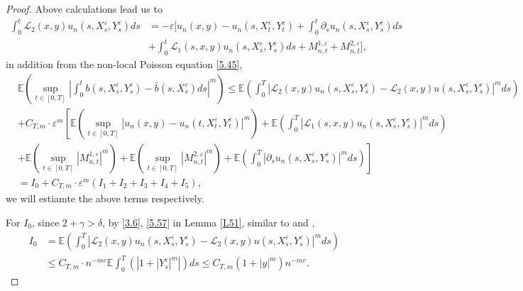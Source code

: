 \documentclass[11pt,reqno]{amsart}
\numberwithin{equation}{section}
\begin{document}
\begin{proof}
Above calculations lead us to 
\begin{align*}
\int_{0}^{t}\mathcal{L}_{2}(x,y)u_{n}(s,X_{s}^{\varepsilon},Y_{s}^{\varepsilon})ds	
&=-\varepsilon\bigg[ u_{n}(x,y)-u_{n}(s,X_{t}^{\varepsilon},Y_{t}^{\varepsilon})+\int_{0}^{t}\partial_{s}u_{n}(s,X_{s}^{\varepsilon},Y_{s}^{\varepsilon})ds\\
&+\int_{0}^{t}\mathcal{L}_{1}(s,x,y)u_{n}(s,X_{s}^{\varepsilon},Y_{s}^{\varepsilon})ds +M_{n,t}^{1,\varepsilon}+M_{n,t}^{2,\varepsilon}\bigg],
\end{align*}
in addition from the non-local Poisson equation \eqref{5.45},
\begin{align}
	&\mathbb{E}\left( \sup_{t\in [0,T]}\left| \int_{0}^{t} b(s,X_{s}^{\varepsilon},Y_{s}^{\varepsilon})-\bar{b}(s,X_{s}^{\varepsilon})ds\right| ^{m}\right)\leq  \mathbb{E}\left(  \int_{0}^{T}\left|\mathcal{L}_{2}(x,y)u_{n}(s,X_{s}^{\varepsilon},Y_{s}^{\varepsilon})-\mathcal{L}_{2}(x,y)u(s,X_{s}^{\varepsilon},Y_{s}^{\varepsilon})\right|^{m}ds \right)\nonumber\\
	&+ C_{T,m}\cdot \varepsilon^{m}\left[ \mathbb{E}\left( \sup_{t\in [0,T]}|u_{n}(x,y)-u_{n}(t,X_{t}^{\varepsilon},Y_{t}^{\varepsilon})|^{m}\right) +\mathbb{E}\left( \int_{0}^{T}|\mathcal{L}_{1}(s,x,y)u_{n}(s,X_{s}^{\varepsilon},Y_{s}^{\varepsilon})|^{m}ds\right)\nonumber\right.	\\
	&\left.+\mathbb{E}\left( \sup_{t\in [0,T]}|M_{n,t}^{1,\varepsilon}|^{m}\right)+\mathbb{E}\left( \sup_{t\in [0,T]}|M_{n,t}^{2,\varepsilon}|^{m}\right) + \mathbb{E}\left(  \int_{0}^{T}\left|\partial_{s}u_{n}(s,X_{s}^{\varepsilon},Y_{s}^{\varepsilon})\right|^{m}ds
	\right)\right] \nonumber\\
	&=I_{0}+C_{T,m}\cdot \varepsilon^{m}\left( I_{1}+I_{2}+I_{3}+I_{4}+I_{5}\right),\label{5.48}
\end{align}
we will estiamte the above terms respectively. 
	
For $I_{0}$, since $2+\gamma> \delta$, by \eqref{3.6}, \eqref{5.57} in Lemma \ref{L51},  similar to \cite[Lemma 4.2]{RX} and \cite[Theorem 5.5]{KY},
\begin{align}
	I_{0}&=\mathbb{E}\left(  \int_{0}^{T}\left|\mathcal{L}_{2}(x,y)u_{n}(s,X_{s}^{\varepsilon},Y_{s}^{\varepsilon})-\mathcal{L}_{2}(x,y)u(s,X_{s}^{\varepsilon},Y_{s}^{\varepsilon})\right|^{m}ds \right)\nonumber\\
	&\leq C_{T,m}\cdot n^{-mv}\mathbb{E}\int_{0}^{T}(\left|1+|Y_{s}^{\varepsilon}|^{m}\right|)ds\leq C_{T,m}(1+|y|^{m})n^{-mv}.\label{5.49-1}
\end{align}


\end{proof}
\end{document}
